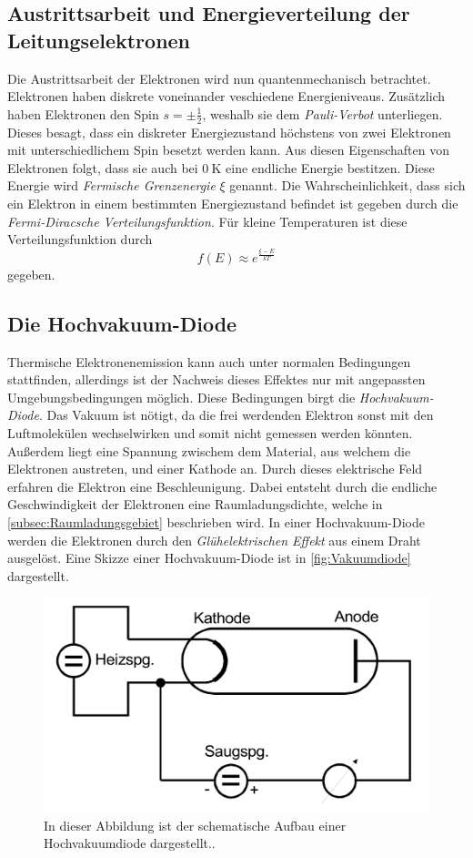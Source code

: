 \subsection{Austrittsarbeit und Energieverteilung der Leitungselektronen}
\label{subsec:Austrittsarbeit}
Die Austrittsarbeit der Elektronen wird nun quantenmechanisch betrachtet. Elektronen haben diskrete voneinander veschiedene Energieniveaus. Zusätzlich haben Elektronen 
den Spin $s = \pm\frac{1}{2}$, weshalb sie dem \textit{Pauli-Verbot} unterliegen. Dieses besagt, dass ein diskreter Energiezustand höchstens von zwei Elektronen mit 
unterschiedlichem Spin besetzt werden kann. Aus diesen Eigenschaften von Elektronen folgt, dass sie auch bei $\qty{0}{\kelvin}$ eine endliche Energie bestitzen. Diese Energie
wird \textit{Fermische Grenzenergie} $\xi$ genannt. Die Wahrscheinlichkeit, dass sich ein Elektron in einem bestimmten Energiezustand befindet ist gegeben durch die
\textit{Fermi-Diracsche Verteilungsfunktion}. Für kleine Temperaturen ist diese Verteilungsfunktion durch
\begin{equation}
    f(E) \approx e^\frac{\xi - E}{kT}
\end{equation}
gegeben.

\subsection{Die Hochvakuum-Diode}
\label{subsec:Hochvakuum-Diode}
Thermische Elektronenemission kann auch unter normalen Bedingungen stattfinden, allerdings ist der Nachweis dieses Effektes nur mit angepassten Umgebungsbedingungen möglich.
Diese Bedingungen birgt die \textit{Hochvakuum-Diode}. Das Vakuum ist nötigt, da die frei werdenden Elektron sonst mit den Luftmolekülen wechselwirken und somit nicht gemessen
werden könnten. Außerdem liegt eine Spannung zwischem dem Material, aus welchem die Elektronen austreten, und einer Kathode an. Durch dieses elektrische Feld erfahren die 
Elektron eine Beschleunigung. Dabei entsteht durch die endliche Geschwindigkeit der Elektronen eine Raumladungsdichte, welche in \autoref{subsec:Raumladungsgebiet} beschrieben
wird. In einer Hochvakuum-Diode werden die Elektronen durch den \textit{Glühelektrischen Effekt} aus einem Draht ausgelöst. Eine Skizze einer Hochvakuum-Diode ist in 
\autoref{fig:Vakuumdiode} dargestellt.

\begin{figure}
    \centering
    \includegraphics[width = .5\textwidth]{content/Vakuumdiode.png}
    \caption{In dieser Abbildung ist der schematische Aufbau einer Hochvakuumdiode dargestellt.\cite{v504}.}
    \label{fig:Vakuumdiode}
\end{figure}

